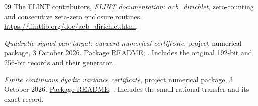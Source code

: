 \documentclass[11pt]{article}
\theoremstyle{remark}
\numberwithin{equation}{section}
\begin{document}
\begin{thebibliography}{99}
The FLINT contributors, \emph{FLINT documentation: acb\_dirichlet},
zero-counting and consecutive zeta-zero enclosure routines.
\url{https://flintlib.org/doc/acb_dirichlet.html}.

\emph{Quadratic signed-pair target: outward numerical certificate},
project numerical package, 3 October 2026.
\href{../investigations/sonin-critical-boundary/numerics/selective_loss_quadratic_target_20261003/README.md}{Package README};
.
Includes the original 192-bit and 256-bit records and their generator.

\emph{Finite continuous dyadic variance certificate},
project numerical package, 3 October 2026.
\href{../investigations/sonin-critical-boundary/numerics/subpower_finite_variance_20261003/README.md}{Package README};
.
Includes the small rational transfer and its exact record.
\end{thebibliography}
\end{document}
